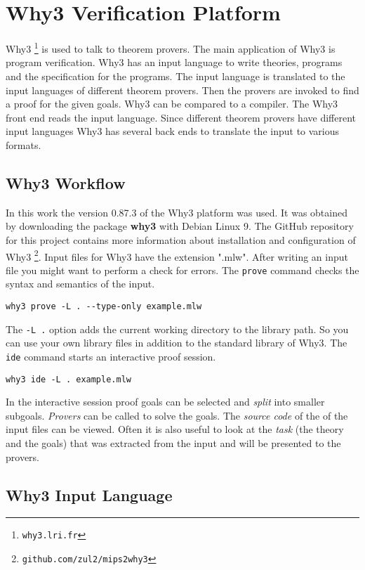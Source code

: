 \section{Why3 Verification Platform}

Why3 \footnote{\verb"why3.lri.fr"} is used to talk to theorem provers. The main
application of Why3 is program verification. Why3 has an input language 
to write theories, programs and the specification for the programs. 
The input language is translated to the input languages of different theorem
provers. Then the provers are invoked to find a proof for the given goals.
Why3 can be compared to a compiler. The Why3 front end reads the input
language. Since different theorem provers have different input languages
Why3 has several back ends to translate the input to various formats.

\subsection{Why3 Workflow}

In this work the version 0.87.3 of the Why3 platform was used.
It was obtained by downloading the package \textbf{why3} with Debian Linux 9.
The GitHub repository for this project contains more information about
installation and configuration of Why3 \footnote{\verb"github.com/zul2/mips2why3"}. 
Input files for Why3 have the extension ".mlw". After writing an input file
you might want to perform a check for errors. The \verb"prove" command checks
the syntax and semantics of the input.
\begin{lstlisting}
why3 prove -L . --type-only example.mlw
\end{lstlisting}
The \verb"-L ." option adds the current working directory to the library path.
So you can use your own library files in addition to the 
standard library of Why3.
The \verb"ide" command starts an interactive proof session.
\begin{lstlisting}
why3 ide -L . example.mlw
\end{lstlisting}
In the interactive session proof goals can be selected and \emph{split} into 
smaller subgoals. \emph{Provers} can be called to solve the goals. 
The \emph{source code} of the of the input files can be viewed. Often it is also useful
to look at the \emph{task} (the theory and the goals) that was extracted from
the input and will be presented to the provers.

\subsection{Why3 Input Language}

